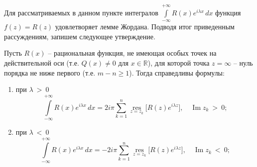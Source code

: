 Для рассматриваемых в данном пункте интегралов $\textstyle{\int\limits_{-\infty}^{+\infty} R(x)e^{i\lambda x}\,dx}$ функция $f(z)=R(z)$ удовлетворяет лемме Жордана. Подводя итог приведенным рассуждениям, запишем следующее утверждение.
\begin{assertion}
Пусть $R(x)$ -- рациональная функция, не имеющая особых точек на действительной оси (т.е. $Q(x)\ne0$ для $x\in\mathbb{R}$), для которой точка $z=\infty$ -- нуль порядка не ниже первого (т.е. $m-n\geqslant1$). Тогда справедливы формулы:
\begin{enumerate}
\item при $\lambda\: >\: 0$
$$
\int\limits_{-\infty}^{+\infty} R(x)e^{i\lambda x}\,dx= 2i\pi \sum_{k=1}^{n} \mathop{\operatorname{res}}\limits_{z=z_k} \bigl[R(z)e^{i\lambda z}\bigr],\quad \operatorname{Im} z_k\: >\: 0;
$$
\item при $\lambda\: <\: 0$
$$
\int\limits_{-\infty}^{+\infty} R(x)e^{i\lambda x}\,dx=-2i\pi\sum_{k=1}^{n} \mathop{\operatorname{res}}\limits_{z=z_k} \bigl[R(z)e^{i\lambda z}\bigr],\quad \operatorname{Im} z_k\: <\: 0;
$$
\end{enumerate}
\end{assertion}
